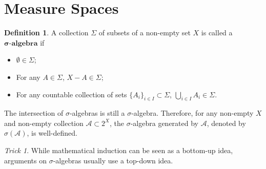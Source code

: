 \documentclass[openany]{book}
\theoremstyle{definition}
\newtheorem{definition}{Definition}[chapter]
\theoremstyle{remark}
\newtheorem*{trick}{Trick}
\begin{document}
\section{Measure Spaces}
\begin{definition}
    A collection $\Sigma$ of subsets of a non-empty set $X$ is called a $\boldsymbol{\sigma}\textbf{-algebra}$ if
    \begin{itemize}
        \item $\emptyset\in\Sigma$;
        \item For any $A\in\Sigma$, $X-A\in\Sigma$;
        \item For any countable collection of sets $\{A_i\}_{i\in I}\subset\Sigma$, $\bigcup_{i\in I}A_i\in\Sigma$.
    \end{itemize}
\end{definition}
The intersection of $\sigma$-algebras is still a $\sigma$-algebra. Therefore, for any non-empty $X$ and non-empty collection $\mathcal{A}\subset 2^X$, the $\sigma$-algebra generated by $\mathcal{A}$, denoted by $\sigma(\mathcal{A})$, is well-defined.
\begin{trick}
    While mathematical induction can be seen as a bottom-up idea, arguments on $\sigma$-algebras usually use a top-down idea.
\end{trick}
\end{document}
